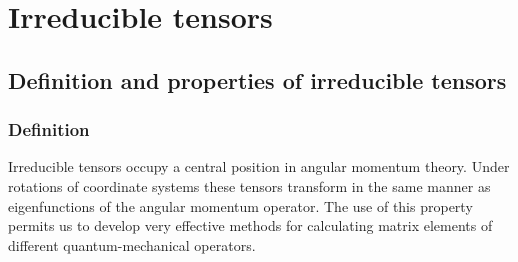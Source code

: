 \chapter{Irreducible tensors}\label{chap:3}
\section{Definition and properties of irreducible tensors}\label{sec:3.1}
\subsection{Definition}\label{sec:3.1.1}
Irreducible tensors occupy a central position in angular momentum theory. Under rotations of coordinate systems these tensors transform in the same manner as eigenfunctions of the angular momentum operator. The use of this property permits us to develop very effective methods for calculating matrix elements of different quantum-mechanical operators.

